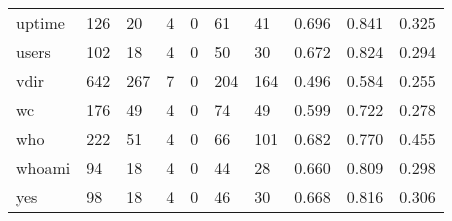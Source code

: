 \begin{longtable}{lp{1.3cm}p{1.3cm}p{1.3cm}p{1.3cm}p{1.3cm}p{1.3cm}p{1.3cm}p{1.3cm}p{1.3cm}}
uptime    &                    126 &                                 20 &                                 4 &                                0 &                                61 &                              41 &                                0.696 &                                  0.841 &                                0.325 \\
users     &                    102 &                                 18 &                                 4 &                                0 &                                50 &                              30 &                                0.672 &                                  0.824 &                                0.294 \\
vdir      &                    642 &                                267 &                                 7 &                                0 &                               204 &                             164 &                                0.496 &                                  0.584 &                                0.255 \\
wc        &                    176 &                                 49 &                                 4 &                                0 &                                74 &                              49 &                                0.599 &                                  0.722 &                                0.278 \\
who       &                    222 &                                 51 &                                 4 &                                0 &                                66 &                             101 &                                0.682 &                                  0.770 &                                0.455 \\
whoami    &                     94 &                                 18 &                                 4 &                                0 &                                44 &                              28 &                                0.660 &                                  0.809 &                                0.298 \\
yes       &                     98 &                                 18 &                                 4 &                                0 &                                46 &                              30 &                                0.668 &                                  0.816 &                                0.306 \\
\end{longtable}
